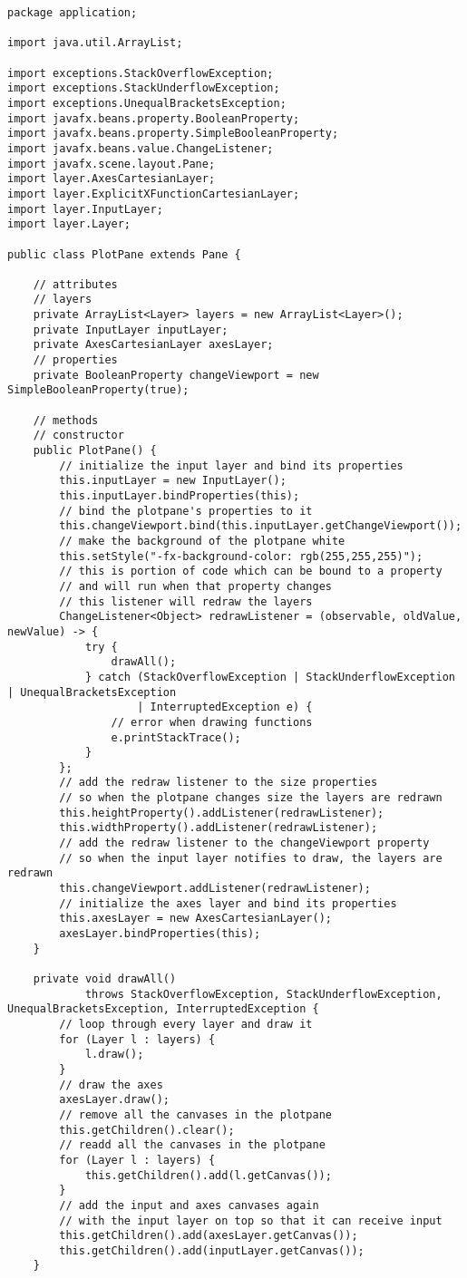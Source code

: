 \documentclass[../../../../main.tex]{subfiles}
\begin{document}
\begin{verbatim}
package application;

import java.util.ArrayList;

import exceptions.StackOverflowException;
import exceptions.StackUnderflowException;
import exceptions.UnequalBracketsException;
import javafx.beans.property.BooleanProperty;
import javafx.beans.property.SimpleBooleanProperty;
import javafx.beans.value.ChangeListener;
import javafx.scene.layout.Pane;
import layer.AxesCartesianLayer;
import layer.ExplicitXFunctionCartesianLayer;
import layer.InputLayer;
import layer.Layer;

public class PlotPane extends Pane {

	// attributes
	// layers
	private ArrayList<Layer> layers = new ArrayList<Layer>();
	private InputLayer inputLayer;
	private AxesCartesianLayer axesLayer;
	// properties
	private BooleanProperty changeViewport = new SimpleBooleanProperty(true);

	// methods
	// constructor
	public PlotPane() {
		// initialize the input layer and bind its properties
		this.inputLayer = new InputLayer();
		this.inputLayer.bindProperties(this);
		// bind the plotpane's properties to it
		this.changeViewport.bind(this.inputLayer.getChangeViewport());
		// make the background of the plotpane white
		this.setStyle("-fx-background-color: rgb(255,255,255)");
		// this is portion of code which can be bound to a property
		// and will run when that property changes
		// this listener will redraw the layers
		ChangeListener<Object> redrawListener = (observable, oldValue, newValue) -> {
			try {
				drawAll();
			} catch (StackOverflowException | StackUnderflowException | UnequalBracketsException
					| InterruptedException e) {
				// error when drawing functions
				e.printStackTrace();
			}
		};
		// add the redraw listener to the size properties
		// so when the plotpane changes size the layers are redrawn
		this.heightProperty().addListener(redrawListener);
		this.widthProperty().addListener(redrawListener);
		// add the redraw listener to the changeViewport property
		// so when the input layer notifies to draw, the layers are redrawn
		this.changeViewport.addListener(redrawListener);
		// initialize the axes layer and bind its properties
		this.axesLayer = new AxesCartesianLayer();
		axesLayer.bindProperties(this);
	}

	private void drawAll()
			throws StackOverflowException, StackUnderflowException, UnequalBracketsException, InterruptedException {
		// loop through every layer and draw it
		for (Layer l : layers) {
			l.draw();
		}
		// draw the axes
		axesLayer.draw();
		// remove all the canvases in the plotpane
		this.getChildren().clear();
		// readd all the canvases in the plotpane
		for (Layer l : layers) {
			this.getChildren().add(l.getCanvas());
		}
		// add the input and axes canvases again
		// with the input layer on top so that it can receive input
		this.getChildren().add(axesLayer.getCanvas());
		this.getChildren().add(inputLayer.getCanvas());
	}


\end{verbatim}
\end{document}
